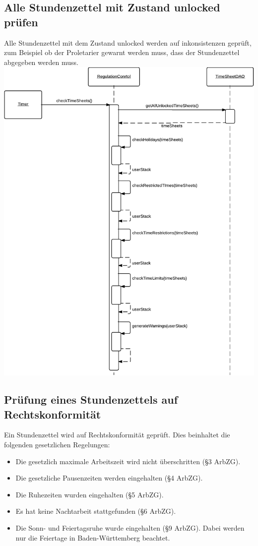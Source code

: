     \newpage
    \subsection{Alle Stundenzettel mit Zustand unlocked prüfen}
        Alle Stundenzettel mit dem Zustand unlocked werden auf inkonsistenzen geprüft, zum Beispiel ob der Proletarier gewarnt werden muss, dass der Stundenzettel abgegeben werden muss.\\

        \includegraphics[width=\linewidth]{Diagramms/sequenzes/check_inconsistencies.pdf}

    \newpage
    \subsection{Prüfung eines Stundenzettels auf Rechtskonformität}
        Ein Stundenzettel wird auf Rechtskonformität geprüft.
        Dies beinhaltet die folgenden gesetzlichen Regelungen:
        \begin{itemize}
            \item Die gesetzlich maximale Arbeitszeit wird nicht überschritten (§3 ArbZG).
            \item Die gesetzliche Pausenzeiten werden eingehalten (§4 ArbZG).
            \item Die Ruhezeiten wurden eingehalten (§5 ArbZG).
            \item Es hat keine Nachtarbeit stattgefunden (§6 ArbZG).
            \item Die Sonn- und Feiertagsruhe wurde eingehalten (§9 ArbZG).
                Dabei werden nur die Feiertage in Baden-Württemberg beachtet.
        \end{itemize}

